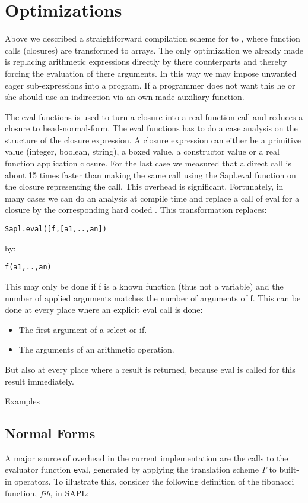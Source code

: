 \section{Optimizations}\label{sapljs:sec:optimizations}
Above we described a straightforward compilation scheme for \Sapl to \JS, where function calls (closures) are transformed to arrays.
The only optimization we already made is replacing arithmetic expressions directly by there \JS counterparts 
and thereby forcing the evaluation of there arguments. 
In this way we may impose unwanted eager sub-expressions into a program. 
If a programmer does not want this he or she should use an indirection via an own-made auxiliary function.

The \textsf{eval} functions is used to turn a closure into a real \JS function call and reduces a closure to head-normal-form.
The \textsf{eval} functions has to do a case analysis on the structure of the closure expression.
A closure expression can either be a primitive value (integer, boolean, string), a boxed value, a constructor value or a real function application closure.
For the last case we measured that a direct \JS call is about 15 times faster than making the same call using the 
\textsf{Sapl.eval} function on the closure representing the call. This overhead is significant. 
Fortunately, in many cases we can do an analysis at compile time and replace a call of \textsf{eval} for a closure by the corresponding hard coded \JS.
This transformation replaces:
\begin{verbatim}
Sapl.eval([f,[a1,..,an])
\end{verbatim}
by:
\begin{verbatim}
f(a1,..,an)
\end{verbatim}
This may only be done if \textsf{f} is a known function (thus not a variable) and the number of applied arguments matches the
number of arguments of \textsf{f}.
This can be done at every place where an explicit \textsf{eval} call is done:
\begin{itemize}
\item The first argument of a \textsf{select} or \textsf{if}.
\item The arguments of an arithmetic operation.
\end{itemize}
But also at every place where a result is returned, because \textsf{eval} is called for this result immediately.


Examples

\subsection{Normal Forms}
A major source of overhead in the current implementation are the calls to the
evaluator function {\texttt eval}, generated by applying the translation scheme
$T$ to built-in operators. To illustrate this, consider the following definition
of the fibonacci function, $fib$, in SAPL:

